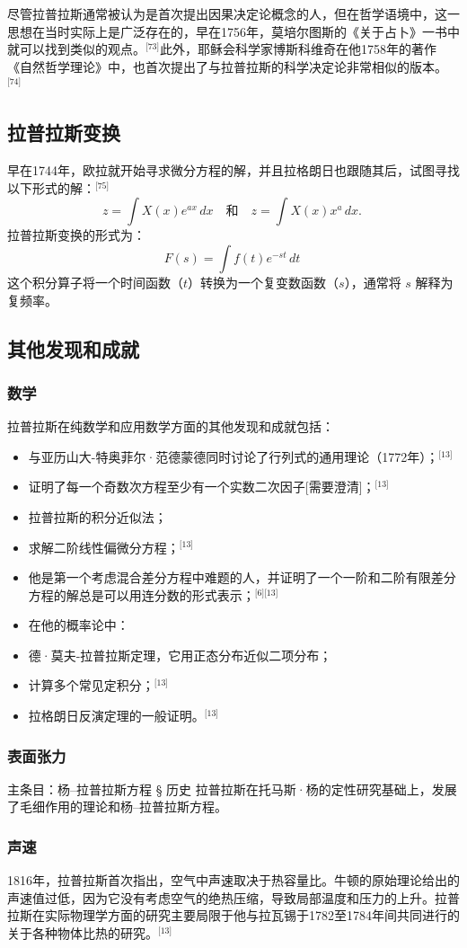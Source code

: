 尽管拉普拉斯通常被认为是首次提出因果决定论概念的人，但在哲学语境中，这一思想在当时实际上是广泛存在的，早在1756年，莫培尔图斯的《关于占卜》一书中就可以找到类似的观点。\(^\text{[73]}\)此外，耶稣会科学家博斯科维奇在他1758年的著作《自然哲学理论》中，也首次提出了与拉普拉斯的科学决定论非常相似的版本。\(^\text{[74]}\)
\subsection{拉普拉斯变换}    
早在1744年，欧拉就开始寻求微分方程的解，并且拉格朗日也跟随其后，试图寻找以下形式的解：\(^\text{[75]}\)  
\[ z = \int X(x) e^{ax} \, dx \quad \text{和} \quad z = \int X(x) x^a \, dx. ~\]
拉普拉斯变换的形式为：
\[
F(s) = \int f(t) e^{-st} \, dt~
\]
这个积分算子将一个时间函数（\( t \)）转换为一个复变数函数（\( s \)），通常将 \( s \) 解释为复频率。
\subsection{其他发现和成就}  
\subsubsection{数学}
拉普拉斯在纯数学和应用数学方面的其他发现和成就包括：
\begin{itemize}
\item 与亚历山大-特奥菲尔·范德蒙德同时讨论了行列式的通用理论（1772年）；\(^\text{[13]}\)
\item 证明了每一个奇数次方程至少有一个实数二次因子[需要澄清]；\(^\text{[13]}\)
\item 拉普拉斯的积分近似法；
\item 求解二阶线性偏微分方程；\(^\text{[13]}\)
\item 他是第一个考虑混合差分方程中难题的人，并证明了一个一阶和二阶有限差分方程的解总是可以用连分数的形式表示；\(^\text{[6][13]}\)
\item 在他的概率论中：
\item 德·莫夫-拉普拉斯定理，它用正态分布近似二项分布；
\item 计算多个常见定积分；\(^\text{[13]}\)
\item 拉格朗日反演定理的一般证明。\(^\text{[13]}\)
\end{itemize}
\subsubsection{表面张力}  
主条目：杨–拉普拉斯方程 § 历史  
拉普拉斯在托马斯·杨的定性研究基础上，发展了毛细作用的理论和杨–拉普拉斯方程。
\subsubsection{声速}  
1816年，拉普拉斯首次指出，空气中声速取决于热容量比。牛顿的原始理论给出的声速值过低，因为它没有考虑空气的绝热压缩，导致局部温度和压力的上升。拉普拉斯在实际物理学方面的研究主要局限于他与拉瓦锡于1782至1784年间共同进行的关于各种物体比热的研究。\(^\text{[13]}\)
